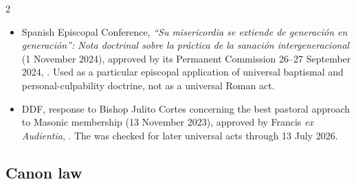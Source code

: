 \begin{multicols}{2}
{\begin{itemize}[itemsep=0.1em,topsep=0.15em]
\item Spanish Episcopal Conference, \emph{“Su misericordia se extiende de generación en generación”: Nota doctrinal sobre la práctica de la sanación intergeneracional} (1 November 2024), approved by its Permanent Commission 26--27 September 2024, . Used as a particular episcopal application of universal baptismal and personal-culpability doctrine, not as a universal Roman act.
\item DDF, response to Bishop Julito Cortes concerning the best pastoral approach to Masonic membership (13 November 2023), approved by Francis \emph{ex Audientia}, . The  was checked for later universal acts through 13 July 2026.
\end{itemize}}

\subsection*{Canon law}


\end{multicols}
